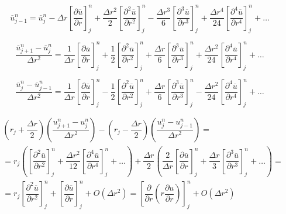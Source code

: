 \begin{equation*}
	\overline{u}_{j-1}^n = \overline{u}_j^n - \Delta r \left[ \dfrac{\partial \overline{u}}{\partial r} \right]_j^n + \dfrac{\Delta r^2}{2} \left[ \dfrac{\partial^2 \overline{u}}{\partial r^2} \right]_j^n -
	\dfrac{\Delta r^3}{6} \left[ \dfrac{\partial^3 \overline{u}}{\partial r^3} \right]_j^n +
	\dfrac{\Delta r^4}{24} \left[ \dfrac{\partial^4 \overline{u}}{\partial r^4} \right]_j^n + \dots
\end{equation*}

\begin{equation*}
	\dfrac{\overline{u}_{j+1}^n - \overline{u}_j^n}{\Delta r^2} =
	\dfrac{1}{\Delta r} \left[ \dfrac{\partial \overline{u}}{\partial r} \right]_j^n + \dfrac{1}{2} \left[ \dfrac{\partial^2 \overline{u}}{\partial r^2} \right]_j^n +
	\dfrac{\Delta r}{6} \left[ \dfrac{\partial^3 \overline{u}}{\partial r^3} \right]_j^n +
	\dfrac{\Delta r^2}{24} \left[ \dfrac{\partial^4 \overline{u}}{\partial r^4} \right]_j^n + \dots
\end{equation*}

\begin{equation*}
	\dfrac{\overline{u}_j^n - \overline{u}_{j-1}^n}{\Delta r^2} =
	\dfrac{1}{\Delta r} \left[ \dfrac{\partial \overline{u}}{\partial r} \right]_j^n - \dfrac{1}{2} \left[ \dfrac{\partial^2 \overline{u}}{\partial r^2} \right]_j^n +
	\dfrac{\Delta r}{6} \left[ \dfrac{\partial^3 \overline{u}}{\partial r^3} \right]_j^n -
	\dfrac{\Delta r^2}{24} \left[ \dfrac{\partial^4 \overline{u}}{\partial r^4} \right]_j^n + \dots
\end{equation*}

\begin{equation} \label{ftcs_accurancy_space}
\begin{split}
	&\left(r_j + \dfrac{\Delta r}{2}\right) \left( \dfrac{u_{j+1}^n - u_j^n}{\Delta r^2} \right) -
	\left(r_j - \dfrac{\Delta r}{2}\right) \left( \dfrac{u_{j}^n - u_{j-1}^n}{\Delta r^2} \right) = \\
	&= r_j \left( \left[ \dfrac{\partial^2 \overline{u}}{\partial r^2} \right]_j^n + \dfrac{\Delta r^2}{12} \left[ \dfrac{\partial^4 \overline{u}}{\partial r^4} \right]_j^n + \dots \right) + 
	\dfrac{\Delta r}{2} \left( \dfrac{2}{\Delta r} \left[ \dfrac{\partial \overline{u}}{\partial r} \right]_j^n + 
	\dfrac{\Delta r}{3} \left[ \dfrac{\partial^3 \overline{u}}{\partial r^3} \right]_j^n  + \dots \right) = \\
	&= r_j \left[ \dfrac{\partial^2 \overline{u}}{\partial r^2} \right]_j^n + \left[ \dfrac{\partial \overline{u}}{\partial r} \right]_j^n + O(\Delta r^2) = 
	\left[ \dfrac{\partial}{\partial r} \left( r \dfrac{\partial u}{\partial r} \right) \right]_j^n + O(\Delta r^2)
\end{split}
\end{equation}

